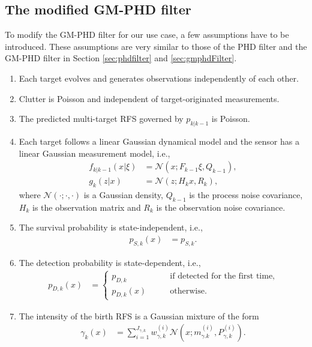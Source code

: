 \subsection{The modified GM-PHD filter}
To modify the GM-PHD filter for our use case, a few assumptions have to be introduced. These assumptions are very
similar to those of the PHD filter and the GM-PHD filter in Section \ref{sec:phdfilter} and \ref{sec:gmphdFilter}.
\begin{enumerate}
  \item Each target evolves and generates observations independently of each other. \label{as:mphd_1}
  \item Clutter is Poisson and independent of target-originated measurements. \label{as:mphd_2}
  \item The predicted multi-target RFS governed by $p_{k|k-1}$ is Poisson. \label{as:mphd_3}
  \item Each target follows a linear Gaussian dynamical model and the sensor has a linear \label{as:mphd_4}
  Gaussian measurement model, i.e.,
  \begin{align}
    f_{k|k-1}(x|\xi) &= \mathcal{N}(x; F_{k-1}\xi, Q_{k-1}),\\
    g_k(z|x) &= \mathcal{N}(z;H_kx, R_k),
  \end{align}
  where $\mathcal{N}(\cdot;\cdot,\cdot)$ is a Gaussian density, $Q_{k-1}$ is the process noise covariance, $H_k$ is the observation matrix and $R_k$ is the observation noise covariance.
  \item The survival probability is state-independent, i.e.,
  \begin{align}
    p_{S,k}(x) &= p_{S,k}.
  \end{align}
    \label{as:mphd_5}
  \item The detection probability is state-dependent, i.e.,
    \begin{align}
      p_{D,k}(x) &= 
      \begin{cases}
         p_{D,k} &\qquad \text{if detected for the first time,} \\
         p_{D,k}(x) &\qquad \text{otherwise.}
      \end{cases}
    \end{align}
    \label{as:mphd_6}
  \item The intensity of the birth RFS is a Gaussian mixture of the form
  \begin{align}
    \gamma_k(x) &= \sum_{i=1}^{J_{\gamma,k}}w_{\gamma,k}^{(i)} \mathcal{N}\left(x; m_{\gamma.k}^{(i)}, P_{\gamma,k}^{(i
    )}\right).
    \label{eq:mphd_intensity}
  \end{align}
  \label{as:mphd_7}
\end{enumerate}
